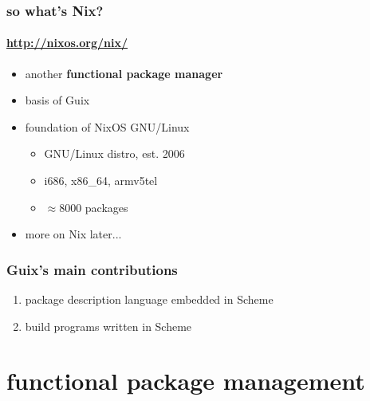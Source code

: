 \documentclass{beamer}
\begin{document}
\begin{frame}
  \frametitle{so what's Nix?}
  \framesubtitle{\url{http://nixos.org/nix/}}

  \begin{itemize}
  \item another \textbf{functional package manager}
  \item basis of Guix
  \item{foundation of NixOS GNU/Linux
      \begin{itemize}
      \item GNU/Linux distro, est. 2006
      \item i686, x86\_64, armv5tel
      \item $\approx$8000 packages
      \end{itemize}
    }
  \item<2-> more on Nix later...
  \end{itemize}
\end{frame}

\begin{frame}
  \frametitle{Guix's main contributions}

  \large{
  \begin{enumerate}
    \item{package description language \alert{embedded in Scheme}
        }
    \item{\alert{build programs} written in Scheme
        }
  \end{enumerate}
  }
\end{frame}

\section{functional package management}
\end{document}
